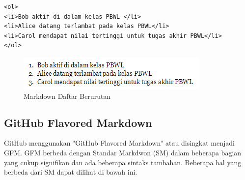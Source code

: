 \begin{itemize}
\begin{enumerate}[(1)]
\begin{lstlisting}[basicstyle=\footnotesize]
<ol>
<li>Bob aktif di dalam kelas PBWL </li>
<li>Alice datang terlambat pada kelas PBWL</li>
<li>Carol mendapat nilai tertinggi untuk tugas akhir PBWL</li>
</ol>
\end{lstlisting}
\begin{figure}[H]
\centering
\includegraphics[scale=1]{Gambar/daftarberurutan.png}
\caption[Markdown Daftar Berurutan]{Markdown Daftar Berurutan}
\label{fig:dafarberurutan}
\end{figure}
\end{enumerate}
\end{itemize}

\subsection{GitHub Flavored Markdown \cite{Markdown:2015}}
GitHub menggunakan "GitHub Flavored Markdown" atau disingkat menjadi GFM. GFM berbeda dengan Standar Markdwon (SM) dalam beberapa bagian yang cukup signifikan dan ada beberapa sintaks tambahan. Beberapa hal yang berbeda dari SM dapat dilihat di bawah ini.

